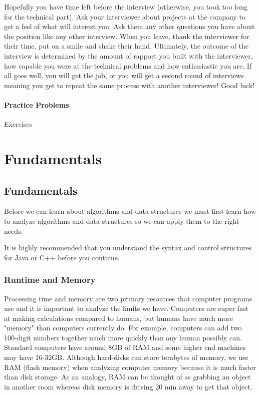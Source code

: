 \documentclass[11pt,oneside]{book}
\begin{document}
Hopefully you have time left before the interview (otherwise, you took too long for the technical part). Ask your interviewer about projects at the company to get a feel of what will interest you. Ask them any other questions you have about the position like any other interview. When you leave, thank the interviewer for their time, put on a smile and shake their hand. Ultimately, the outcome of the interview is determined by the amount of rapport you built with the interviewer, how capable you were at the technical problems and how enthusiastic you are. If all goes well, you will get the job, or you will get a second round of interviews meaning you get to repeat the same process with another interviewer! Good luck!

\subsection{Practice Problems}

Exercises

\part{ Fundamentals }
    \chapter{ Fundamentals }
        

Before we can learn about algorithms and data structures we must first learn how to analyze algorithms and data structures so we can apply them to the right needs.

It is highly recommended that you understand the syntax and control structures for Java or C++ before you continue.


        \section{ Runtime and Memory }
        

Processing time and memory are two primary resources that computer programs use and it is important to analyze the limits we have. Computers are super fast at making calculations compared to humans, but humans have much more "memory" than computers currently do. For example, computers can add two 100-digit numbers together much more quickly than any human possibly can. Standard computers have around 8GB of RAM and some higher end machines may have 16-32GB. Although hard-disks can store terabytes of memory, we use RAM (flash memory) when analyzing computer memory because it is much faster than disk storage. As an analogy, RAM can be thought of as grabbing an object in another room whereas disk memory is driving 20 min away to get that object.
\end{document}
